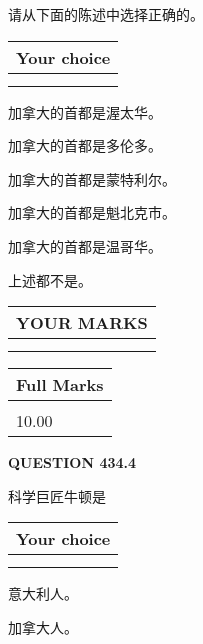 \documentclass{ctexart}
\begin{document}
  
请从下面的陈述中选择正确的。
  
  
\noindent\hspace{3.0in} \begin{tabular}{|l|}
\hline
Your choice \\
\hline
 \\ 
 \\ 
\hline
\end{tabular}
  
  
 
 
加拿大的首都是渥太华。
 
 
加拿大的首都是多伦多。
 
 
加拿大的首都是蒙特利尔。
 
 
加拿大的首都是魁北克市。
 
 
加拿大的首都是温哥华。
 
 
 上述都不是。
 
 
  
\vspace{0.2in}
  
\noindent\begin{tabular}{|l|}
\hline
 YOUR MARKS  \\
\hline
 \\ 
 \\ 
\hline
\end{tabular}
\hspace{0.05in} \begin{tabular}{|l|}
\hline
 Full Marks  \\
\hline
 \\ 
10.00 \\
\hline
\end{tabular}
{\textbf{\Large{QUESTION
434.4 
}}}
  
  
科学巨匠牛顿是
  
  
\noindent\hspace{3.0in} \begin{tabular}{|l|}
\hline
Your choice \\
\hline
 \\ 
 \\ 
\hline
\end{tabular}
  
  
 
 
意大利人。
 
 
加拿大人。
 
\end{document}
